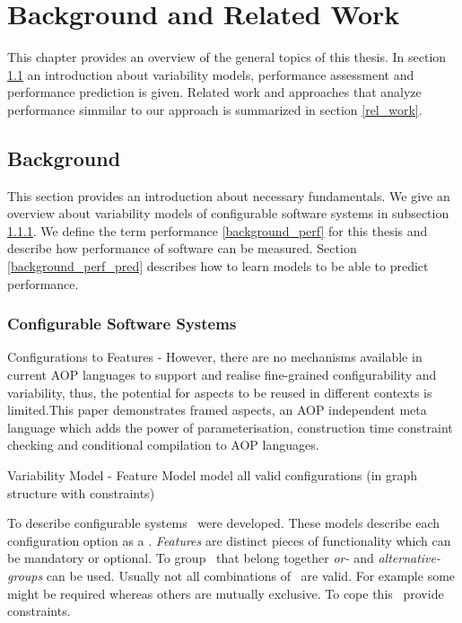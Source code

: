 \chapter{Background and Related Work}
\label{b_a_rel_work}

This chapter provides an overview of the general topics of this thesis. In section \ref{background} an introduction about variability models, performance assessment and performance prediction is given. Related work and approaches that analyze performance simmilar to our approach is summarized in section \ref{rel_work}.

\section{Background}
\label{background}

This section provides an introduction about necessary fundamentals. We give an overview about variability models of configurable software systems in subsection \ref{background_conf_sys}. We define the term performance \ref{background_perf} for this thesis and describe how performance of software can be measured. Section \ref{background_perf_pred} describes how to learn models to be able to predict performance.


\subsection{Configurable Software Systems}
\label{background_conf_sys}

Configurations to Features - 
\cite{loughran2004framed}
However, there are no mechanisms available in current AOP languages to support and realise fine-grained configurability and variability, thus, the potential for aspects to be reused in different contexts is limited.This paper demonstrates framed aspects, an AOP independent meta language which adds the power of parameterisation, construction time constraint checking and conditional compilation to AOP languages.

Variability Model - Feature Model
model all valid configurations (in graph structure with constraints)





To describe configurable systems \fmsit\ were developed. These models describe each configuration option as a \featureit. \textit{Features} are distinct pieces of functionality which can be mandatory or optional. To group \featuresit\ that belong together \textit{or-} and \textit{alternative-groups} can be used. Usually not all combinations of \featuresit\ are valid. For example some might be required whereas others are mutually exclusive. To cope this \fmsit\ provide constraints.



